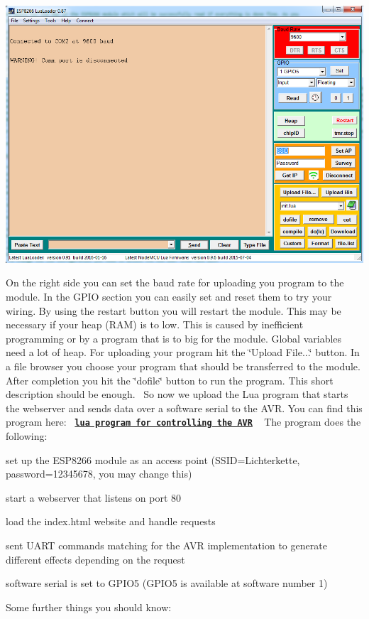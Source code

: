 \begin{DoxyImage}
\includegraphics[width=\textwidth,height=\textheight/2,keepaspectratio=true]{LuaLoader.png}
\caption{E\+S\+P8266 Lua Loader}
\end{DoxyImage}
On the right side you can set the baud rate for uploading you program to the module. In the G\+P\+I\+O section you can easily set and reset them to try your wiring. By using the restart button you will restart the module. This may be necessary if your heap (R\+A\+M) is to low. This is caused by inefficient programming or by a program that is to big for the module. Global variables need a lot of heap. For uploading your program hit the \char`\"{}\+Upload File...\char`\"{} button. In a file browser you choose your program that should be transferred to the module. After completion you hit the \char`\"{}dofile\char`\"{} button to run the program. This short description should be enough.~\newline
 So now we upload the Lua program that starts the webserver and sends data over a software serial to the A\+V\+R. You can find this program here\+:~\newline
 \href{complex_server.lua}{\tt {\bfseries lua program for controlling the A\+V\+R}} ~\newline
 The program does the following\+: 
\begin{DoxyItemize}
\item set up the E\+S\+P8266 module as an access point (S\+S\+I\+D=Lichterkette, password=12345678, you may change this) 
\item start a webserver that listens on port 80 
\item load the index.\+html website and handle requests 
\item sent U\+A\+R\+T commands matching for the A\+V\+R implementation to generate different effects depending on the request 
\item software serial is set to G\+P\+I\+O5 (G\+P\+I\+O5 is available at software number 1) 
\end{DoxyItemize}Some further things you should know\+: 
